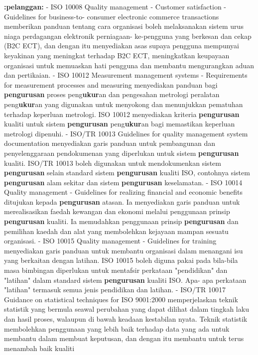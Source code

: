 \documentclass{article}
\begin{document}
\textbf{:pelanggan:} - ISO 10008 Quality management - Customer satisfaction - Guidelines for business-to-
 consumer electronic commerce transactions memberikan panduan tentang cara
 organisasi boleh melaksanakan sistem urus niaga perdagangan elektronik perniagaan-
 ke-pengguna yang berkesan dan cekap (B2C ECT), dan dengan itu menyediakan asas
 supaya pengguna mempunyai keyakinan yang meningkat terhadap B2C ECT,
 meningkatkan keupayaan organisasi untuk memuaskan hati pengguna dan membantu
 mengurangkan aduan dan pertikaian.
- ISO 10012 Measurement management systems - Requirements for measurement
 processes and measuring menyediakan panduan bagi \textbf{pengurusan} proses peng\textbf{ukur}an
 dan pengesahan metrologi peralatan peng\textbf{ukur}an yang digunakan untuk menyokong dan
 menunjukkan pematuhan terhadap keperluan metrologi. ISO 10012 menyediakan kriteria
 \textbf{pengurusan} kualiti untuk sistem \textbf{pengurusan} peng\textbf{ukur}an bagi memastikan keperluan
 metrologi dipenuhi.
- ISO/TR 10013 Guidelines for quality management system documentation menyediakan
 garis panduan untuk pembangunan dan penyelenggaraan pendokumenan yang
 diperlukan untuk sistem \textbf{pengurusan} kualiti. ISO/TR 10013 boleh digunakan untuk
 mendokumenkan sistem \textbf{pengurusan} selain standard sistem \textbf{pengurusan} kualiti
 ISO, contohnya sistem \textbf{pengurusan} alam sekitar dan sistem \textbf{pengurusan} keselamatan.
- ISO 10014 Quality management - Guidelines for realizing financial and economic
 benefits ditujukan kepada \textbf{pengurusan} atasan. Ia menyediakan garis panduan untuk
 merealisasikan faedah kewangan dan ekonomi melalui penggunaan prinsip \textbf{pengurusan}
 kualiti. Ia memudahkan penggunaan prinsip \textbf{pengurusan} dan pemilihan kaedah dan alat
 yang membolehkan kejayaan mampan sesuatu organisasi.
- ISO 10015 Quality management - Guidelines for training menyediakan garis panduan
 untuk membantu organisasi dalam menangani isu yang berkaitan dengan latihan. ISO
 10015 boleh diguna pakai pada bila-bila masa bimbingan diperlukan untuk mentafsir
 perkataan "pendidikan" dan "latihan" dalam standard sistem \textbf{pengurusan} kualiti ISO. Apa-
 apa perkataan "latihan" termasuk semua jenis pendidikan dan latihan.
- ISO/TR 10017 Guidance on statistical techniques for ISO 9001:2000 memperjelaskan
 teknik statistik yang bermula seawal perubahan yang dapat dilihat dalam tingkah laku dan
 hasil proses, walaupun di bawah keadaan kestabilan nyata. Teknik statistik
 membolehkan penggunaan yang lebih baik terhadap data yang ada untuk membantu
 dalam membuat keputusan, dan dengan itu membantu untuk terus menambah baik kualiti
\end{document}

